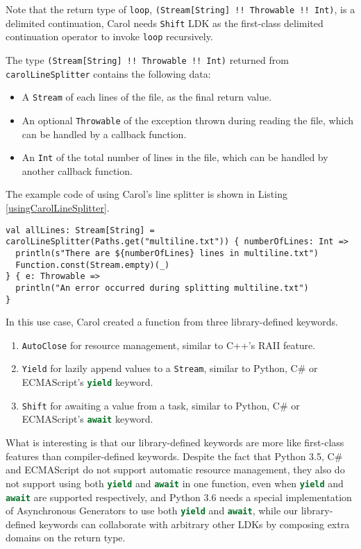 Note that the return type of \lstinline{loop}, \lstinline{(Stream[String] !! Throwable !! Int)}, is a delimited continuation, Carol needs \lstinline{Shift} LDK as the first-class delimited continuation operator\cite{danvy1990abstracting,asai2009typing} to invoke \lstinline{loop} recursively.

The type \lstinline{(Stream[String] !! Throwable !! Int)} returned from \lstinline{carolLineSplitter} contains the following data:

\begin{itemize}
  \item A \lstinline{Stream} of each lines of the file, as the final return value.
  \item An optional \lstinline{Throwable} of the exception thrown during reading the file, which can be handled by a callback function.
  \item An \lstinline{Int} of the total number of lines in the file, which can be handled by another callback function.
\end{itemize}

The example code of using Carol's line splitter is shown in Listing \ref{usingCarolLineSplitter}.

\begin{lstlisting}[caption={Using Carol's line splitter},label={usingCarolLineSplitter}]
val allLines: Stream[String] = carolLineSplitter(Paths.get("multiline.txt")) { numberOfLines: Int =>
  println(s"There are ${numberOfLines} lines in multiline.txt")
  Function.const(Stream.empty)(_)
} { e: Throwable =>
  println("An error occurred during splitting multiline.txt")
}
\end{lstlisting}

In this use case, Carol created a function from three library-defined keywords.

\begin{enumerate}
  \item \lstinline{AutoClose} for resource management, similar to C++'s RAII feature.
  \item \lstinline{Yield} for lazily append values to a \lstinline{Stream}, similar to Python, C\# or ECMAScript's \lstinline[language=Python]{yield} keyword.
  \item \lstinline{Shift} for awaiting a value from a task, similar to Python, C\# or ECMAScript's \lstinline[language=Python]{await} keyword.
\end{enumerate}

What is interesting is that our library-defined keywords are more like first-class features than compiler-defined keywords. Despite the fact that Python 3.5, C\# and ECMAScript do not support automatic resource management, they also do not support using both \lstinline[language=Python]{yield} and \lstinline[language=Python]{await} in one function, even when \lstinline[language=Python]{yield} and \lstinline[language=Python]{await} are supported respectively, and Python 3.6 needs a special implementation of Asynchronous Generators \cite{pep525} to use both \lstinline[language=Python]{yield} and \lstinline[language=Python]{await}, while our library-defined keywords can collaborate with arbitrary other LDKs by composing extra domains on the return type.

